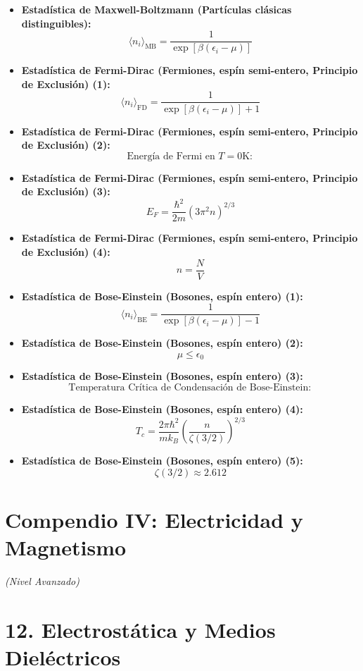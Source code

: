 \documentclass[11pt,a4paper]{article}
\begin{document}
\begin{itemize}
  \item \textbf{Estadística de Maxwell-Boltzmann (Partículas clásicas distinguibles):}
  \[
    \langle n_i \rangle_{\mathrm{MB}} = \frac{1}{\exp[\beta(\epsilon_i - \mu)]}
  \]
  \item \textbf{Estadística de Fermi-Dirac (Fermiones, espín semi-entero, Principio de Exclusión) (1):}
  \[
    \langle n_i \rangle_{\mathrm{FD}} = \frac{1}{\exp[\beta(\epsilon_i - \mu)] + 1}
  \]
  \item \textbf{Estadística de Fermi-Dirac (Fermiones, espín semi-entero, Principio de Exclusión) (2):}
  \[
    \text{Energía de Fermi en } T = 0\mathrm{ K}:
  \]
  \item \textbf{Estadística de Fermi-Dirac (Fermiones, espín semi-entero, Principio de Exclusión) (3):}
  \[
    E_F = \frac{\hbar^2}{2m} (3\pi^2 n)^{2/3}
  \]
  \item \textbf{Estadística de Fermi-Dirac (Fermiones, espín semi-entero, Principio de Exclusión) (4):}
  \[
    n = \frac{N}{V}
  \]
  \item \textbf{Estadística de Bose-Einstein (Bosones, espín entero) (1):}
  \[
    \langle n_i \rangle_{\mathrm{BE}} = \frac{1}{\exp[\beta(\epsilon_i - \mu)] - 1}
  \]
  \item \textbf{Estadística de Bose-Einstein (Bosones, espín entero) (2):}
  \[
    \mu \le \epsilon_0
  \]
  \item \textbf{Estadística de Bose-Einstein (Bosones, espín entero) (3):}
  \[
    \text{Temperatura Crítica de Condensación de Bose-Einstein}:
  \]
  \item \textbf{Estadística de Bose-Einstein (Bosones, espín entero) (4):}
  \[
    T_c = \frac{2\pi \hbar^2}{m k_B} \left( \frac{n}{\zeta(3/2)} \right)^{2/3}
  \]
  \item \textbf{Estadística de Bose-Einstein (Bosones, espín entero) (5):}
  \[
    \zeta(3/2) \approx 2.612
  \]
\end{itemize}

\section*{Compendio IV: Electricidad y Magnetismo}

\textit{(Nivel Avanzado)}

\section*{12. Electrostática y Medios Dieléctricos}
\end{document}

